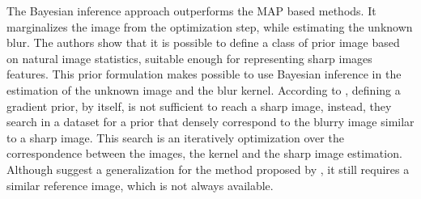 \documentclass[conference,compsoc]{IEEEtran}
\begin{document}
The Bayesian inference approach \cite{Levin} outperforms the MAP based methods. It marginalizes
the image from the optimization step, while estimating the unknown blur.
The authors show that it is possible to define a class of prior image
based on natural image statistics, suitable enough for representing sharp images features.
This prior formulation makes possible to use Bayesian inference in the estimation of the
unknown image and the blur kernel. According to \cite{Hacohen13}, defining a gradient
prior, by itself, is not sufficient to reach a sharp image, instead,
they search in a dataset for a prior that densely correspond to
the blurry image similar to a sharp image. This search is an
iteratively optimization over the correspondence between the images, the kernel and
the sharp image estimation. Although \cite{Pan2014} suggest a generalization
for the method proposed by \cite{Hacohen13}, it still requires a similar reference image,
which is not always available.
\end{document}
